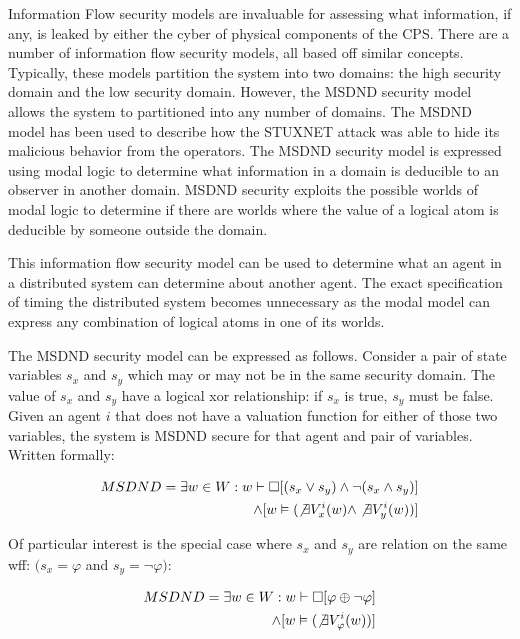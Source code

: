 Information Flow security models are invaluable for assessing what information, if any, is leaked by either the cyber of physical components of the \ac{CPS}. There are a number of information flow security models, all based off similar concepts. Typically, these models partition the system into two domains: the high security domain and the low security domain. However, the MSDND security model allows the system to partitioned into any number of domains. The MSDND model has been used to describe how the STUXNET attack was able to hide its malicious behavior from the operators. The MSDND security model is expressed using modal logic to determine what information in a domain is deducible to an observer in another domain. MSDND security exploits the possible worlds of modal logic to determine if there are worlds where the value of a logical atom is deducible by someone outside the domain.

This information flow security model can be used to determine what an agent in a distributed system can determine about another agent. The exact specification of timing the distributed system becomes unnecessary as the modal model can express any combination of logical atoms in one of its worlds. \cite{Howser2012}\cite{STUXNET}\cite{Howser2013}

The MSDND security model can be expressed as follows\cite{STUXNET}. Consider a pair of state variables $s_x$ and $s_y$ which may or may not be in the same security domain. The value of $s_x$ and $s_y$ have a logical xor relationship: if $s_x$ is true, $s_y$ must be false. Given an agent $i$ that does not have a valuation function for either of those two variables, the system is MSDND secure for that agent and pair of variables. Written formally:

\begin{align}
MSDND = \exists w \in W : w \vdash \Box [ (s_x \vee s_y) \wedge \neg(s_x \wedge s_y) ] 
\nonumber \\ \wedge [ w \vDash ( \not \exists V_x^i (w) \wedge \not \exists V_y^i (w) ) ]
\end{align}

Of particular interest is the special case where $s_x$ and $s_y$ are relation on the same wff: $(s_x = \varphi$ and $s_y = \neg \varphi)$:

\begin{align}
MSDND = \exists w \in W : w \vdash \Box [ \varphi \oplus \neg \varphi ] 
\nonumber \\ \wedge [ w \vDash ( \not \exists V_\varphi^i(w)) ]
\end{align}

